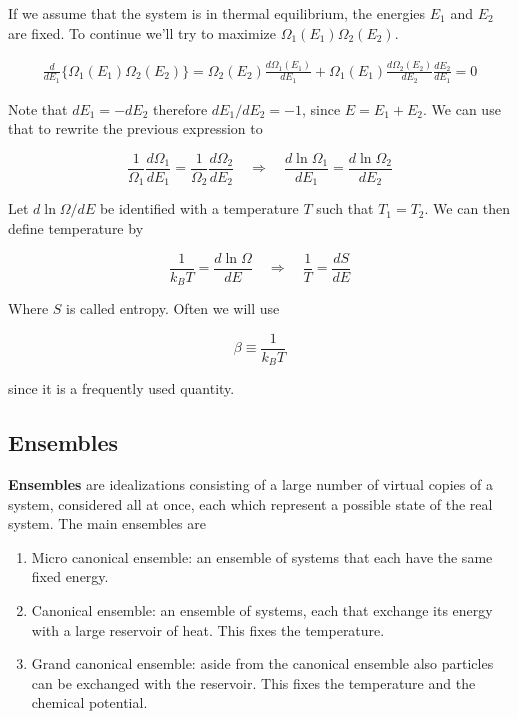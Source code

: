 \documentclass[a4paper]{article}
\begin{document}
\bigskip

If we assume that the system is in thermal equilibrium, the energies $E_1$ and $E_2$ are fixed. To continue we'll try to maximize $\Omega_1(E_1)\Omega_2(E_2)$.

\begin{align}
	\frac{d}{dE_1}\bigg\{\Omega_1(E_1)\Omega_2(E_2)\bigg\}=\Omega_2(E_2)\frac{d\Omega_1(E_1)}{dE_1}+\Omega_1(E_1)\frac{d\Omega_2(E_2)}{dE_2}\frac{dE_2}{dE_1}=0
\end{align}

Note that $dE_1=-dE_2$ therefore $dE_1/dE_2=-1$, since $E=E_1+E_2$. We can use that to rewrite the previous expression to

\begin{equation}
	\frac{1}{\Omega_1}\frac{d\Omega_1}{dE_1}=\frac{1}{\Omega_2}\frac{d\Omega_2}{dE_2}\quad\Rightarrow\quad\frac{d\ln\Omega_1}{dE_1}=\frac{d\ln\Omega_2}{dE_2}
\end{equation}

Let $d\ln\Omega/dE$ be identified with a temperature $T$ such that $T_1=T_2$. We can then define temperature by

\begin{equation}
	\frac{1}{k_BT}=\frac{d\ln\Omega}{dE}\quad\Rightarrow\quad\frac{1}{T}=\frac{dS}{dE}
\end{equation}

Where $S$ is called entropy. Often we will use 

\begin{equation}
	\beta\equiv\frac{1}{k_BT}
\end{equation}

since it is a frequently used quantity.

\subsection{Ensembles}

\textbf{Ensembles} are idealizations consisting of a large number of virtual copies of a system, considered all at once, each which represent a possible state of the real system. The main ensembles are

\begin{enumerate}
	\item Micro canonical ensemble: an ensemble of systems that each have the same fixed energy.
	\item Canonical ensemble: an ensemble of systems, each that exchange its energy with a large reservoir of heat. This fixes the temperature.
	\item Grand canonical ensemble: aside from the canonical ensemble also particles can be exchanged with the reservoir. This fixes the temperature and the chemical potential.
\end{enumerate}
\end{document}
